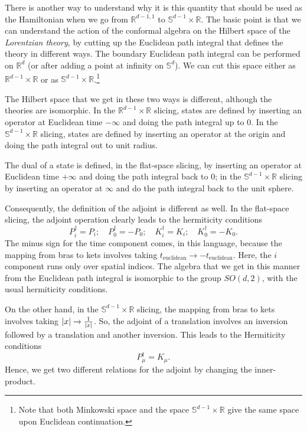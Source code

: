 There is another way to understand why it is this quantity that should
be used as the Hamiltonian when we go from ${\mathbb R}^{d-1,1}$ to ${\mathbb S}^{d-1} \times {\mathbb R}$. The basic point is that we can understand the action of the conformal algebra on the Hilbert space of the {\em Lorentzian theory}, by cutting up the Euclidean path integral that defines the theory in different ways. The boundary Euclidean path integral can be performed on ${\mathbb R}^d$ (or after adding a point at infinity on ${\mathbb S}^d$). We can cut this space either as ${\mathbb R}^{d-1} \times {\mathbb R}$ or as ${\mathbb S}^{d-1} \times {\mathbb R}$.\footnote{Note that both Minkowski space and the space ${\mathbb S}^{d-1} \times {\mathbb R}$ give the same space upon Euclidean continuation.} 

The Hilbert space that we get in these two ways is different, although
the theories are isomorphic. In the ${\mathbb R}^{d-1} \times {\mathbb
  R}$ slicing, states are defined by inserting an operator at
Euclidean time $-\infty$ and doing the path integral up to $0$. In the
${\mathbb S}^{d-1} \times {\mathbb R}$ slicing, states are defined by
inserting an operator at the origin and doing the path integral out to
unit radius. 

The dual of a state is defined, in the flat-space slicing, by inserting an operator at Euclidean time $+\infty$ and doing the path integral back to $0$; in the ${\mathbb S}^{d-1} \times {\mathbb R}$ slicing by inserting an operator at $\infty$ and do the path integral back to the unit sphere.

Consequently, the definition of the adjoint is different as well. In the flat-space slicing, the adjoint operation clearly leads to the hermiticity conditions
\[
P_i^\dagger = P_i; \quad P_0^{\dagger} = -P_0; \quad K_i^\dagger =
K_i; \quad K_0^{\dagger} = -K_0. 
 \]
The minus sign for the time component comes, in this language, because the mapping from bras to kets involves taking $t_{\text{euclidean}} \rightarrow -t_{\text{euclidean}}$. Here, the $i$ component runs only over spatial indices. The algebra that we get in this manner from the Euclidean path integral is isomorphic to the group $SO(d,2)$, with the usual hermiticity conditions.

On the other hand, in the ${\mathbb S}^{d-1} \times {\mathbb R}$ slicing, the mapping from bras to kets involves taking $|x| \rightarrow {1 \over |x|}$. So, the adjoint of a translation involves an inversion followed by a translation and another inversion. This leads to the Hermiticity conditions
\[
P_{\mu}^\dagger = K_{\mu}.
 \]
Hence, we get two different relations for the adjoint by changing the inner-product.







